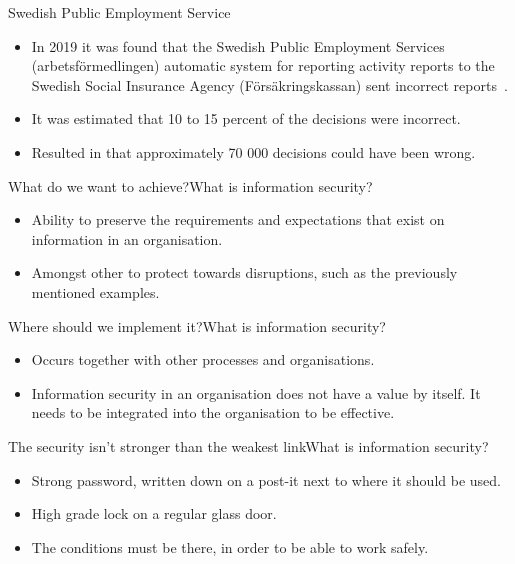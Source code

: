 \documentclass{beamer}
\begin{document}
\begin{frame}{Swedish Public Employment Service}
  \begin{itemize}
    \item In 2019 it was found that the Swedish Public Employment Services
      (arbetsförmedlingen) automatic system for reporting activity reports to
      the Swedish Social Insurance Agency (Försäkringskassan) sent incorrect
      reports~\cite{SvTPublicEmpl2019}.
    \item It was estimated that 10 to 15 percent of the decisions were incorrect.
    \item Resulted in that approximately 70 000 decisions could have been wrong.
  \end{itemize}
\end{frame}

\begin{frame}{What do we want to achieve?}{What is information security?}
  \begin{itemize}
    \item Ability to preserve the requirements and expectations that exist on
      information in an organisation.
    \item Amongst other to protect towards disruptions, such as the previously
      mentioned examples.
  \end{itemize}
\end{frame}

\begin{frame}{Where should we implement it?}{What is information security?}
  \begin{itemize}
    \item Occurs together with other processes and organisations.
    \item Information security in an organisation does not have a value by
      itself. It needs to be integrated into the organisation to be effective.
  \end{itemize}
\end{frame}

\begin{frame}{The security isn't stronger than the weakest link}{What is information security?}
  \begin{itemize}
    \item Strong password, written down on a post-it next to where it should be
      used.
    \item High grade lock on a regular glass door.
    \item The conditions must be there, in order to be able to work safely.
  \end{itemize}
\end{frame}
\end{document}
